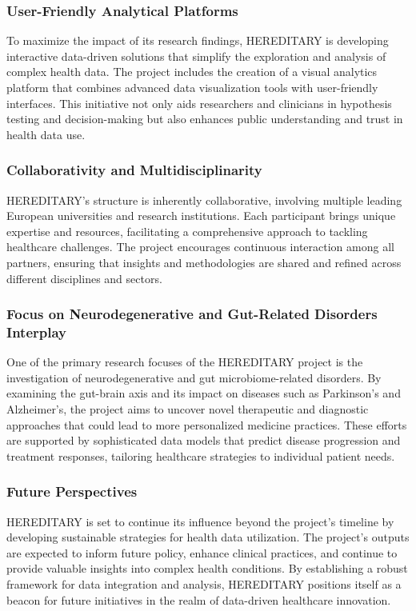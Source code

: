 \subsubsection{User-Friendly Analytical Platforms}
To maximize the impact of its research findings, \ac{HEREDITARY} is developing interactive data-driven solutions that simplify the exploration and analysis of complex health data. The project includes the creation of a visual analytics platform that combines advanced data visualization tools with user-friendly interfaces. This initiative not only aids researchers and clinicians in hypothesis testing and decision-making but also enhances public understanding and trust in health data use.
\subsubsection{Collaborativity and Multidisciplinarity}
\ac{HEREDITARY}'s structure is inherently collaborative, involving multiple leading European universities and research institutions. Each participant brings unique expertise and resources, facilitating a comprehensive approach to tackling healthcare challenges. The project encourages continuous interaction among all partners, ensuring that insights and methodologies are shared and refined across different disciplines and sectors.
\subsubsection{Focus on Neurodegenerative and Gut-Related Disorders Interplay}
One of the primary research focuses of the \ac{HEREDITARY} project is the investigation of neurodegenerative and gut microbiome-related disorders. By examining the gut-brain axis and its impact on diseases such as Parkinson’s and Alzheimer's, the project aims to uncover novel therapeutic and diagnostic approaches that could lead to more personalized medicine practices. These efforts are supported by sophisticated data models that predict disease progression and treatment responses, tailoring healthcare strategies to individual patient needs.
\subsubsection{Future Perspectives}
\ac{HEREDITARY} is set to continue its influence beyond the project's timeline by developing sustainable strategies for health data utilization. The project's outputs are expected to inform future policy, enhance clinical practices, and continue to provide valuable insights into complex health conditions. By establishing a robust framework for data integration and analysis, \ac{HEREDITARY} positions itself as a beacon for future initiatives in the realm of data-driven healthcare innovation.
